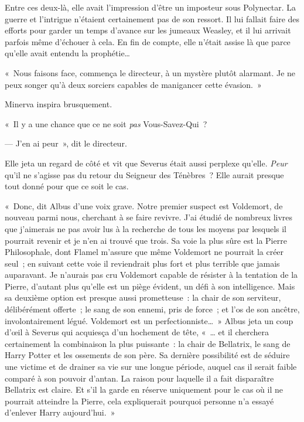 Entre ces deux-là, elle avait l'impression d'être un imposteur sous Polynectar.
La guerre et l'intrigue n'étaient certainement pas de son ressort.
Il lui fallait faire des efforts pour garder un temps d'avance sur les jumeaux Weasley, et il lui arrivait parfois même d'échouer à cela.
En fin de compte, elle n'était assise là que parce qu'elle avait entendu la prophétie…

«~Nous faisons face, commença le directeur, à un mystère plutôt alarmant.
Je ne peux songer qu'à deux sorciers capables de manigancer cette évasion.~»

Minerva inspira brusquement.

«~Il y a une chance que ce ne soit \emph{pas} Vous-Savez-Qui~?

--- J'en ai peur~», dit le directeur.

Elle jeta un regard de côté et vit que Severus était aussi perplexe qu'elle.
\emph{Peur} qu'il ne s'agisse pas du retour du Seigneur des Ténèbres~?
Elle aurait presque tout donné pour que ce soit le cas.

«~Donc, dit Albus d'une voix grave.
Notre premier suspect est Voldemort, de nouveau parmi nous, cherchant à se faire revivre.
J'ai étudié de nombreux livres que j'aimerais ne pas avoir lus à la recherche de tous les moyens par lesquels il pourrait revenir et je n'en ai trouvé que trois.
Sa voie la plus sûre est la Pierre Philosophale, dont Flamel m'assure que même Voldemort ne pourrait la créer seul~; en suivant cette voie il reviendrait plus fort et plus terrible que jamais auparavant.
Je n'aurais pas cru Voldemort capable de résister à la tentation de la Pierre, d'autant plus qu'elle est un piège évident, un défi à son intelligence.
Mais sa deuxième option est presque aussi prometteuse~: la chair de son serviteur, délibérément offerte~; le sang de son ennemi, pris de force~; et l'os de son ancêtre, involontairement légué.
Voldemort est un perfectionniste…~»
Albus jeta un coup d'œil à Severus qui acquiesça d'un hochement de tête, «~… et il cherchera certainement la combinaison la plus puissante~: la chair de Bellatrix, le sang de Harry Potter et les ossements de son père.
Sa dernière possibilité est de séduire une victime et de drainer sa vie sur une longue période, auquel cas il serait faible comparé à son pouvoir d'antan.
La raison pour laquelle il a fait disparaître Bellatrix est claire.
Et s'il la garde en réserve uniquement pour le cas où il ne pourrait atteindre la Pierre, cela expliquerait pourquoi personne n'a essayé d'enlever Harry aujourd'hui.~»

